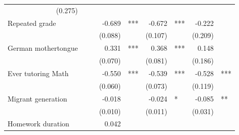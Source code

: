 \documentclass{article}
\begin{document}
\begin{table}[!h]
\begin{tabular}{lllllllll}
  \multicolumn{1}{r}{(0.275)} &
  \multicolumn{1}{l}{} \\
\multicolumn{1}{l}{Repeated grade} &
  \multicolumn{1}{r}{} &
  \multicolumn{1}{l}{} &
  \multicolumn{1}{r}{-0.689} &
  \multicolumn{1}{l}{***} &
  \multicolumn{1}{r}{-0.672} &
  \multicolumn{1}{l}{***} &
  \multicolumn{1}{r}{-0.222} &
  \multicolumn{1}{l}{} \\
\multicolumn{1}{l}{} &
  \multicolumn{1}{r}{} &
  \multicolumn{1}{l}{} &
  \multicolumn{1}{r}{(0.088)} &
  \multicolumn{1}{l}{} &
  \multicolumn{1}{r}{(0.107)} &
  \multicolumn{1}{l}{} &
  \multicolumn{1}{r}{(0.209)} &
  \multicolumn{1}{l}{} \\
\multicolumn{1}{l}{German mothertongue} &
  \multicolumn{1}{r}{} &
  \multicolumn{1}{l}{} &
  \multicolumn{1}{r}{0.331} &
  \multicolumn{1}{l}{***} &
  \multicolumn{1}{r}{0.368} &
  \multicolumn{1}{l}{***} &
  \multicolumn{1}{r}{0.148} &
  \multicolumn{1}{l}{} \\
\multicolumn{1}{l}{} &
  \multicolumn{1}{r}{} &
  \multicolumn{1}{l}{} &
  \multicolumn{1}{r}{(0.070)} &
  \multicolumn{1}{l}{} &
  \multicolumn{1}{r}{(0.081)} &
  \multicolumn{1}{l}{} &
  \multicolumn{1}{r}{(0.186)} &
  \multicolumn{1}{l}{} \\
\multicolumn{1}{l}{Ever tutoring Math} &
  \multicolumn{1}{r}{} &
  \multicolumn{1}{l}{} &
  \multicolumn{1}{r}{-0.550} &
  \multicolumn{1}{l}{***} &
  \multicolumn{1}{r}{-0.539} &
  \multicolumn{1}{l}{***} &
  \multicolumn{1}{r}{-0.528} &
  \multicolumn{1}{l}{***} \\
\multicolumn{1}{l}{} &
  \multicolumn{1}{r}{} &
  \multicolumn{1}{l}{} &
  \multicolumn{1}{r}{(0.060)} &
  \multicolumn{1}{l}{} &
  \multicolumn{1}{r}{(0.073)} &
  \multicolumn{1}{l}{} &
  \multicolumn{1}{r}{(0.119)} &
  \multicolumn{1}{l}{} \\
\multicolumn{1}{l}{Migrant generation} &
  \multicolumn{1}{r}{} &
  \multicolumn{1}{l}{} &
  \multicolumn{1}{r}{-0.018} &
  \multicolumn{1}{l}{} &
  \multicolumn{1}{r}{-0.024} &
  \multicolumn{1}{l}{*} &
  \multicolumn{1}{r}{-0.085} &
  \multicolumn{1}{l}{**} \\
\multicolumn{1}{l}{} &
  \multicolumn{1}{r}{} &
  \multicolumn{1}{l}{} &
  \multicolumn{1}{r}{(0.010)} &
  \multicolumn{1}{l}{} &
  \multicolumn{1}{r}{(0.011)} &
  \multicolumn{1}{l}{} &
  \multicolumn{1}{r}{(0.031)} &
  \multicolumn{1}{l}{} \\
\multicolumn{1}{l}{Homework duration} &
  \multicolumn{1}{r}{} &
  \multicolumn{1}{l}{} &
  \multicolumn{1}{r}{0.042} &
  \multicolumn{1}{l}{} &

\end{tabular}
\end{table}
\end{document}
